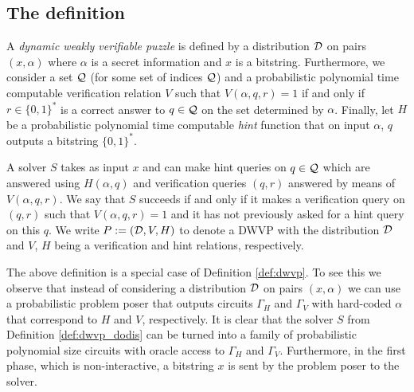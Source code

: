 \subsection{The definition}
\begin{definition}
  \label{def:dwvp_dodis}
  A \textit{dynamic weakly verifiable puzzle} is defined by a distribution $\mathcal{D}$ on pairs $(x, \alpha)$ where
  $\alpha$ is a secret information and $x$ is a bitstring.
  Furthermore, we consider a set $\mathcal{Q}$ (for some set of indices $\mathcal{Q}$) and a probabilistic polynomial time computable verification relation $V$ such that
  $V(\alpha, q, r) = 1$ if and only if $r \in \{0,1\}^{*}$ is a correct answer to $q \in \mathcal{Q}$
  on the set determined by $\alpha$. Finally, let $H$ be a probabilistic polynomial time computable \textit{hint} function
  that on input $\alpha$, $q$ outputs a bitstring $\{0,1\}^{*}$.

  A solver $S$ takes as input $x$ and can make hint queries on $q \in \mathcal{Q}$ which are answered using $H(\alpha, q)$ and verification
  queries $(q,r)$ answered by means of $V(\alpha, q, r)$.
  We say that $S$ succeeds if and only if it makes a verification query on $(q,r)$ such that
  $V(\alpha,q,r) = 1$ and it has not previously asked for a hint query on this $q$.
  We write $P := (\mathcal{D}, V, H)$ to denote a DWVP with the distribution $\mathcal{D}$ and $V$, $H$ being a verification and hint relations, respectively.
\end{definition}
%
The above definition is a special case of Definition \ref{def:dwvp}.
To see this we observe that instead of considering a distribution $\mathcal{D}$ on pairs $(x,\alpha)$
we can use a probabilistic problem poser that outputs circuits $\Gamma_H$ and $\Gamma_V$ with hard-coded $\alpha$ that correspond to $H$ and $V$, respectively.
It is clear that the solver $S$ from Definition \ref{def:dwvp_dodis} can be turned into a family of probabilistic polynomial size circuits
with oracle access to $\Gamma_H$ and $\Gamma_V$. Furthermore, in the first phase, which is non-interactive,
a bitstring $x$ is sent by the problem poser to the solver.

